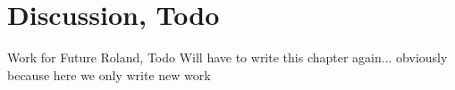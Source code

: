\chapter{Discussion, Todo}
Work for Future Roland, Todo
Will have to write this chapter again... obviously because here we only write new work











